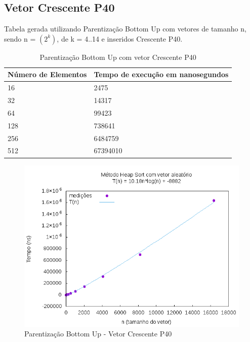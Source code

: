\documentclass[12pt,a4paper,twoside]{report}
\begin{document}
\subsection{Vetor Crescente P40}
Tabela gerada utilizando Parentização Bottom Up com vetores de tamanho n, sendo n = $(2^k)$, de k = 4..14 e inseridos Crescente P40.
\begin{table}[H]
\centering
\caption{Parentização Bottom Up com vetor Crescente P40}
\label{my-label}
\begin{tabular}{|l|l|}
\hline
\multicolumn{1}{|c|}{\textbf{Número de Elementos}} & \multicolumn{1}{c|}{\textbf{Tempo de execução em nanosegundos}} \\ \hline
16 & 2475 \\ \hline
32 & 14317 \\ \hline
64 & 99423 \\ \hline
128 & 738641 \\ \hline
256 & 6484759 \\ \hline
512 & 67394010 \\ \hline

\end{tabular}
\end{table}

\begin{figure}[H]
    \centering
    \includegraphics[width=0.7\linewidth]{graficos/HeapSort/vIntAleatorio/vIntAleatorio.png}
  \caption{Parentização Bottom Up - Vetor Crescente P40}
\end{figure}
\end{document}
